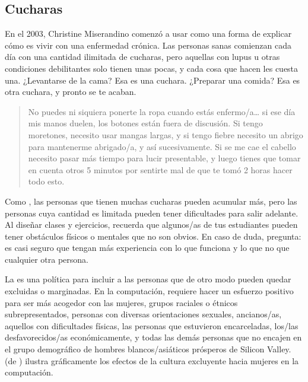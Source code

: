 \subsection*{Cucharas}

En el 2003,
Christine Miserandino comenzó a usar 
como una forma de explicar cómo es vivir con una enfermedad crónica.
Las personas sanas comienzan cada día con una cantidad ilimitada de cucharas,
pero aquellas con lupus u otras condiciones debilitantes solo tienen unas pocas,
y cada cosa que hacen les cuesta una.
¿Levantarse de la cama?
Esa es una cuchara.
¿Preparar una comida?
Esa es otra cuchara, y pronto se te acaban.

\begin{quote}

  No puedes ni siquiera ponerte la ropa cuando estás enfermo/a{\dots}
  si ese día mis manos duelen, los botones están fuera de discusión.
  Si tengo moretones,
  necesito usar mangas largas,
  y si tengo fiebre necesito un abrigo para mantenerme abrigado/a, y así sucesivamente.
  Si se me cae el cabello necesito pasar más tiempo para lucir presentable,
  y luego tienes que tomar en cuenta otros 5 minutos por sentirte mal
  de que te tomó 2 horas hacer todo esto.

\end{quote}

Como ,
las personas que tienen muchas cucharas pueden acumular más,
pero las personas cuya cantidad es limitada pueden tener dificultades para salir adelante.
Al diseñar clases y ejercicios,
recuerda que algunos/as de tus estudiantes pueden tener obstáculos físicos o mentales que no son obvios.
En caso de duda, pregunta:
es casi seguro que tengan más experiencia con lo que funciona y lo que no que cualquier otra persona.


La  es una política para
incluir a las personas que de otro modo pueden quedar excluidas o marginadas.
En la computación,
requiere hacer un esfuerzo positivo para ser más acogedor con las mujeres,
grupos raciales o étnicos subrepresentados,
personas con diversas orientaciones sexuales,
ancianos/as,
aquellos con dificultades físicas,
las personas que estuvieron encarceladas,
los/las desfavorecidos/as económicamente,
y todas las demás personas que no encajen en el grupo demográfico de hombres blancos/asiáticos prósperos de Silicon Valley.
 (de )
ilustra gráficamente los efectos de la cultura excluyente hacia mujeres en la computación.

